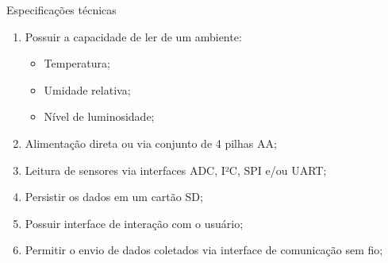 \begin{frame}{Especificações técnicas}

    \begin{enumerate}
        \item Possuir a capacidade de ler de um ambiente:
        \begin{itemize}      
                \item Temperatura;
                \item Umidade relativa;
                \item Nível de luminosidade;
                
        \end{itemize}
        \item Alimentação direta ou via conjunto de 4 pilhas AA;
        \item Leitura de sensores via interfaces ADC, I²C, SPI e/ou UART;
        \item Persistir os dados em um cartão SD;
        \item Possuir interface de interação com o usuário;
        \item Permitir o envio de dados coletados via interface de comunicação sem fio;
    \end{enumerate}
    
\end{frame}


    
     
